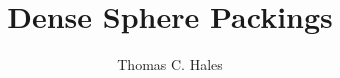 \documentclass[spanningrule]{cambridge7A}
\def\lll{\resetlinenumber[1]}
\def\tocpart#1{
  \addcontentsline{toc}{part}{\Large{#1}}}
\def\linput#1{\lll}
\theoremstyle{plain}
\theoremstyle{definition}
\theoremstyle{remark}
\begin{document}
\title[a blueprint for formal proofs]
    {%
      Dense Sphere Packings}
\author{Thomas C. Hales}
    
    \frontmatter
    \maketitle
    \tableofcontents


 
  \mainmatter
  \begin{runninglinenumbers*}
  
    
    

    

    \linput{local}

    
    \end{runninglinenumbers*}


\raggedright
%
%

\end{document}
